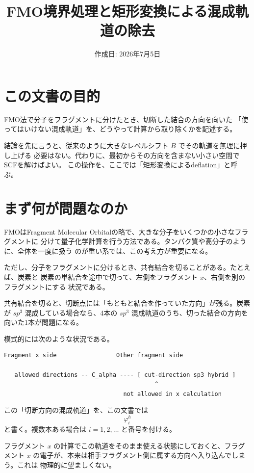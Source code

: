 \documentclass[uplatex,dvipdfmx,11pt]{jsarticle}
\title{FMO境界処理と矩形変換による混成軌道の除去}
\author{}
\date{作成日: 2026年7月5日}
\begin{document}
\maketitle

\section*{この文書の目的}

FMO法で分子をフラグメントに分けたとき、切断した結合の方向を向いた
「使ってはいけない混成軌道」を、どうやって計算から取り除くかを記述する。

結論を先に言うと、従来のように大きなレベルシフト \(B\) でその軌道を無理に押し上げる
必要はない。代わりに、最初からその方向を含まない小さい空間でSCFを解けばよい。
この操作を、ここでは「矩形変換によるdeflation」と呼ぶ。

\section{まず何が問題なのか}

FMOはFragment Molecular Orbitalの略で、大きな分子をいくつかの小さなフラグメントに
分けて量子化学計算を行う方法である。タンパク質や高分子のように、全体を一度に扱う
のが重い系では、この考え方が重要になる。

ただし、分子をフラグメントに分けるとき、共有結合を切ることがある。たとえば、炭素と
炭素の単結合を途中で切って、左側をフラグメント \(x\)、右側を別のフラグメントにする
状況である。

共有結合を切ると、切断点には「もともと結合を作っていた方向」が残る。炭素が
\(sp^3\) 混成している場合なら、4本の \(sp^3\) 混成軌道のうち、切った結合の方向を
向いた1本が問題になる。

模式的には次のような状況である。

\begin{verbatim}
Fragment x side                 Other fragment side

   allowed directions -- C_alpha ---- [ cut-direction sp3 hybrid ]
                                           ^
                                  not allowed in x calculation
\end{verbatim}

この「切断方向の混成軌道」を、この文書では
\[
  \varphi_i^h
\]
と書く。複数本ある場合は \(i=1,2,\ldots\) と番号を付ける。

フラグメント \(x\) の計算でこの軌道をそのまま使える状態にしておくと、フラグメント
\(x\) の電子が、本来は相手フラグメント側に属する方向へ入り込んでしまう。これは
物理的に望ましくない。
\end{document}
